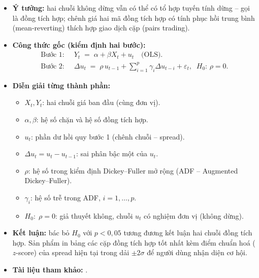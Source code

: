 \documentclass[12pt,a4paper,openany,oneside]{report}
\numberwithin{equation}{chapter}
\begin{document}
\begin{itemize}[leftmargin=18pt,topsep=2pt,itemsep=4pt]
  \item \textbf{Ý tưởng:} hai chuỗi không dừng vẫn có thể có tổ hợp
        tuyến tính dừng -- gọi là đồng tích hợp; chênh giá hai mã đồng
        tích hợp có tính phục hồi trung bình (mean-reverting) thích
        hợp giao dịch cặp (pairs trading).
  \item \textbf{Công thức gốc (kiểm định hai bước):}
        \begin{align}
          \text{Bước 1:}\;\;& Y_t \;=\; \alpha + \beta X_t + u_t
                              \quad \text{(OLS).} \label{eq:eg1}\\
          \text{Bước 2:}\;\;& \Delta u_t \;=\; \rho\, u_{t-1}
                              + \sum_{i=1}^{p}\gamma_i \Delta u_{t-i}
                              + \varepsilon_t,\;\; H_0:\,\rho = 0.
                              \label{eq:eg2}
        \end{align}
  \item \textbf{Diễn giải từng thành phần:}
        \begin{itemize}[leftmargin=14pt,topsep=2pt,itemsep=1pt]
          \item $X_t, Y_t$: hai chuỗi giá ban đầu (cùng đơn vị).
          \item $\alpha, \beta$: hệ số chặn và hệ số đồng tích hợp.
          \item $u_t$: phần dư hồi quy bước 1 (chênh chuỗi -- spread).
          \item $\Delta u_t = u_t - u_{t-1}$: sai phân bậc một của $u_t$.
          \item $\rho$: hệ số trong kiểm định Dickey--Fuller mở rộng
                (ADF -- Augmented Dickey--Fuller).
          \item $\gamma_i$: hệ số trễ trong ADF, $i = 1,\dots,p$.
          \item $H_0:\;\rho = 0$: giả thuyết không, chuỗi $u_t$ có
                nghiệm đơn vị (không dừng).
        \end{itemize}
  \item \textbf{Kết luận:} bác bỏ $H_0$ với $p < 0{,}05$ tương đương kết
        luận hai chuỗi đồng tích hợp. Sản phẩm in bảng các cặp đồng
        tích hợp tốt nhất kèm điểm chuẩn hoá ($z$-score) của spread
        hiện tại trong dải $\pm 2\sigma$ để người dùng nhận diện cơ hội.
  \item \textbf{Tài liệu tham khảo:} \citet{EngleGranger1987}.
\end{itemize}
\end{document}
